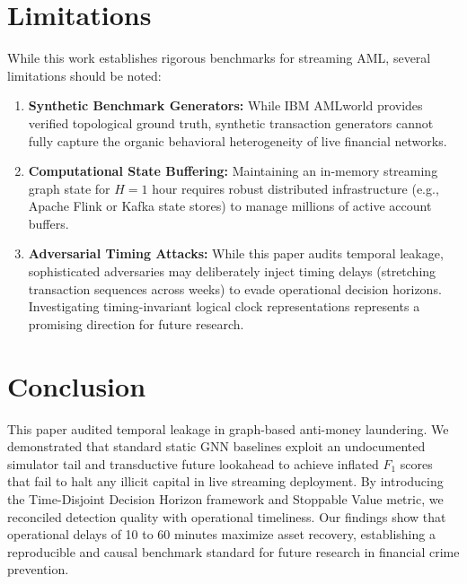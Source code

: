 \documentclass[10pt,twocolumn,letterpaper]{article}
\begin{document}
\section{Limitations}
\label{sec:limitations}

While this work establishes rigorous benchmarks for streaming AML, several limitations should be noted:
\begin{enumerate}[leftmargin=*]
    \item \textbf{Synthetic Benchmark Generators:} While IBM AMLworld provides verified topological ground truth, synthetic transaction generators cannot fully capture the organic behavioral heterogeneity of live financial networks.
    \item \textbf{Computational State Buffering:} Maintaining an in-memory streaming graph state for $H=1\text{ hour}$ requires robust distributed infrastructure (e.g., Apache Flink or Kafka state stores) to manage millions of active account buffers.
    \item \textbf{Adversarial Timing Attacks:} While this paper audits temporal leakage, sophisticated adversaries may deliberately inject timing delays (stretching transaction sequences across weeks) to evade operational decision horizons. Investigating timing-invariant logical clock representations represents a promising direction for future research.
\end{enumerate}

\section{Conclusion}
\label{sec:conclusion}

This paper audited temporal leakage in graph-based anti-money laundering. We demonstrated that standard static GNN baselines exploit an undocumented simulator tail and transductive future lookahead to achieve inflated $F_1$ scores that fail to halt any illicit capital in live streaming deployment. By introducing the Time-Disjoint Decision Horizon framework and Stoppable Value metric, we reconciled detection quality with operational timeliness. Our findings show that operational delays of 10 to 60 minutes maximize asset recovery, establishing a reproducible and causal benchmark standard for future research in financial crime prevention.



\end{document}
